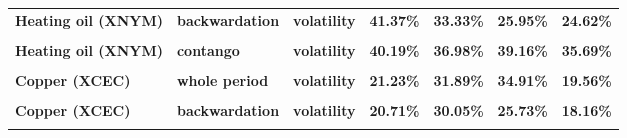 \documentclass[
  authoryear,
  preprint,
  3p]{elsarticle}
\begin{document}
\begin{longtable}[t]{>{}l>{}l>{}l>{}r>{}r>{}r>{}r}
\textbf{Heating oil (XNYM)} & \textbf{backwardation} & \textbf{volatility} & \textcolor[HTML]{4285f4}{\textbf{41.37\%}} & \textcolor[HTML]{4285f4}{\textbf{33.33\%}} & \textcolor[HTML]{4285f4}{\textbf{25.95\%}} & \textcolor[HTML]{4285f4}{\textbf{24.62\%}}\\
\textbf{\cellcolor{gray!10}{Heating oil (XNYM)}} & \textbf{\cellcolor{gray!10}{contango}} & \textbf{\cellcolor{gray!10}{mean}} & \textcolor[HTML]{4285f4}{\textbf{\cellcolor{gray!10}{-2.74\%}}} & \textcolor[HTML]{4285f4}{\textbf{\cellcolor{gray!10}{30.5\%}}} & \textcolor[HTML]{4285f4}{\textbf{\cellcolor{gray!10}{-10.77\%}}} & \textcolor[HTML]{4285f4}{\textbf{\cellcolor{gray!10}{-21.62\%}}}\\
\textbf{Heating oil (XNYM)} & \textbf{contango} & \textbf{volatility} & \textcolor[HTML]{4285f4}{\textbf{40.19\%}} & \textcolor[HTML]{4285f4}{\textbf{36.98\%}} & \textcolor[HTML]{4285f4}{\textbf{39.16\%}} & \textcolor[HTML]{4285f4}{\textbf{35.69\%}}\\
\textbf{\cellcolor{gray!10}{Copper (XCEC)}} & \textbf{\cellcolor{gray!10}{whole period}} & \textbf{\cellcolor{gray!10}{mean}} & \textcolor[HTML]{4285f4}{\textbf{\cellcolor{gray!10}{1.45\%}}} & \textcolor[HTML]{4285f4}{\textbf{\cellcolor{gray!10}{*28.15\%}}} & \textcolor[HTML]{4285f4}{\textbf{\cellcolor{gray!10}{6.19\%}}} & \textcolor[HTML]{4285f4}{\textbf{\cellcolor{gray!10}{-0.1\%}}}\\
\addlinespace
\textbf{Copper (XCEC)} & \textbf{whole period} & \textbf{volatility} & \textcolor[HTML]{4285f4}{\textbf{21.23\%}} & \textcolor[HTML]{4285f4}{\textbf{31.89\%}} & \textcolor[HTML]{4285f4}{\textbf{34.91\%}} & \textcolor[HTML]{4285f4}{\textbf{19.56\%}}\\
\textbf{\cellcolor{gray!10}{Copper (XCEC)}} & \textbf{\cellcolor{gray!10}{backwardation}} & \textbf{\cellcolor{gray!10}{mean}} & \textcolor[HTML]{4285f4}{\textbf{\cellcolor{gray!10}{3.14\%}}} & \textcolor[HTML]{4285f4}{\textbf{\cellcolor{gray!10}{22.17\%}}} & \textcolor[HTML]{4285f4}{\textbf{\cellcolor{gray!10}{16.53\%}}} & \textcolor[HTML]{4285f4}{\textbf{\cellcolor{gray!10}{12.1\%}}}\\
\textbf{Copper (XCEC)} & \textbf{backwardation} & \textbf{volatility} & \textcolor[HTML]{4285f4}{\textbf{20.71\%}} & \textcolor[HTML]{4285f4}{\textbf{30.05\%}} & \textcolor[HTML]{4285f4}{\textbf{25.73\%}} & \textcolor[HTML]{4285f4}{\textbf{18.16\%}}\\
\textbf{\cellcolor{gray!10}{Copper (XCEC)}} & \textbf{\cellcolor{gray!10}{contango}} & \textbf{\cellcolor{gray!10}{mean}} & \textcolor[HTML]{4285f4}{\textbf{\cellcolor{gray!10}{-0.28\%}}} & \textcolor[HTML]{4285f4}{\textbf{\cellcolor{gray!10}{34.17\%}}} & \textcolor[HTML]{4285f4}{\textbf{\cellcolor{gray!10}{-3.46\%}}} & \textcolor[HTML]{4285f4}{\textbf{\cellcolor{gray!10}{-12.15\%}}}\\

\end{longtable}
\end{document}
